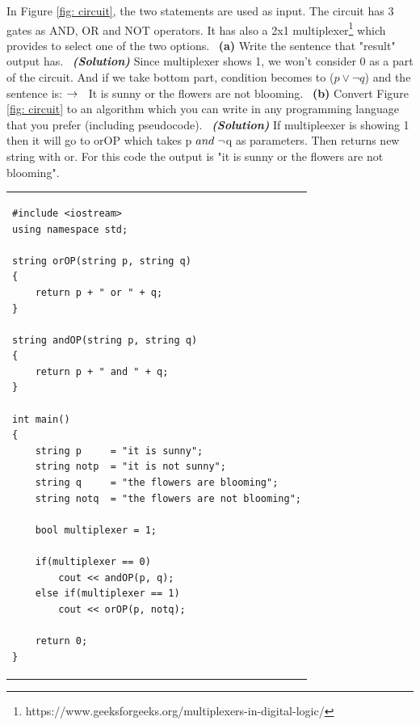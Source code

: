 \documentclass[a4 paper]{article}
\numberwithin{equation}{section}
\newcommand{\subproblem}[1]{~\newline\textbf{(#1)}}
\newcommand{\solution}{~\newline\textbf{\textit{(Solution)}} }
\newcommand{\0}{\mathbf{0}}
\begin{document}
In Figure \ref{fig: circuit}, the two statements are used as input. The circuit has 3 gates as AND, OR and NOT operators. It has also a 2x1 multiplexer\footnote{https://www.geeksforgeeks.org/multiplexers-in-digital-logic/} which provides to select one of the two options.
\newpage
\subproblem{a} Write the sentence that "result" output has.
\solution 
\newline
\newline
    Since multiplexer shows 1, we won't consider 0 as a part of the circuit. And if we take bottom part, condition becomes to ($p\vee\neg q$) and the sentence is:
\newline
\newline
    $\rightarrow\hspace{0.2cm}$ It is sunny or the flowers are not blooming.
\newline
\subproblem{b} Convert Figure \ref{fig: circuit} to an algorithm which you can write in any programming language that you prefer (including pseudocode).
\solution 
\newline
\newline
If multipleexer is showing 1 then it will go to orOP which takes p $ and\hspace{0.1cm}\neg $q as parameters. Then returns new string with or.
\newline
For this code the output is "it is sunny or the flowers are not blooming". 
\newline
\begin{tabular}{|p{10cm}|}
  \begin{verbatim}
#include <iostream>
using namespace std;

string orOP(string p, string q)
{
    return p + " or " + q;
}

string andOP(string p, string q)
{
    return p + " and " + q;
}

int main()
{
    string p     = "it is sunny";
    string notp  = "it is not sunny";
    string q     = "the flowers are blooming";
    string notq  = "the flowers are not blooming";

    bool multiplexer = 1;

    if(multiplexer == 0)
        cout << andOP(p, q);
    else if(multiplexer == 1)
        cout << orOP(p, notq);

    return 0;
}
  \end{verbatim}
\end{tabular}
\newline
\end{document}

